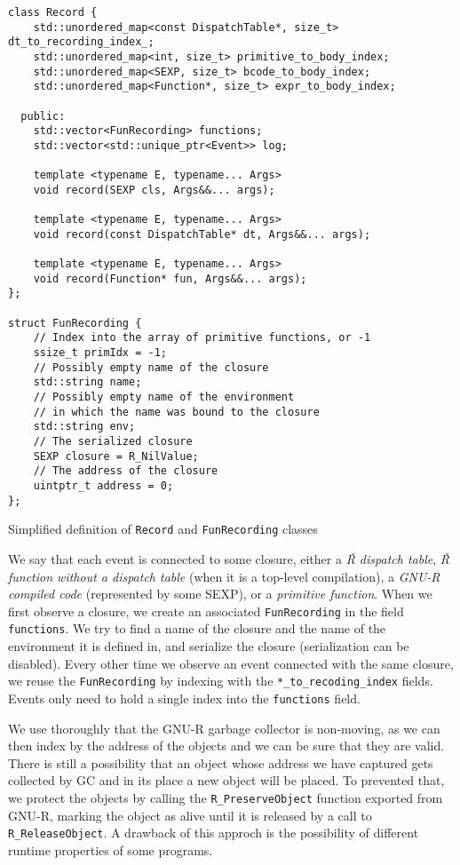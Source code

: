 \begin{listing}
	\begin{verbatim}
class Record {
    std::unordered_map<const DispatchTable*, size_t> dt_to_recording_index_;
    std::unordered_map<int, size_t> primitive_to_body_index;
    std::unordered_map<SEXP, size_t> bcode_to_body_index;
    std::unordered_map<Function*, size_t> expr_to_body_index;

  public:
    std::vector<FunRecording> functions;
    std::vector<std::unique_ptr<Event>> log;

    template <typename E, typename... Args>
    void record(SEXP cls, Args&&... args);

    template <typename E, typename... Args>
    void record(const DispatchTable* dt, Args&&... args);

    template <typename E, typename... Args>
    void record(Function* fun, Args&&... args);
};

struct FunRecording {
    // Index into the array of primitive functions, or -1
    ssize_t primIdx = -1;
    // Possibly empty name of the closure
    std::string name;
    // Possibly empty name of the environment
    // in which the name was bound to the closure
    std::string env;
    // The serialized closure
    SEXP closure = R_NilValue;
    // The address of the closure
    uintptr_t address = 0;
};
  \end{verbatim}
	\caption{Simplified definition of \texttt{Record} and \texttt{FunRecording} classes }\label{lst:record-class}
\end{listing}

We say that each event is connected to some closure, either a \textit{Ř dispatch table}, \textit{Ř function without a dispatch table} (when it is a top-level compilation), a \textit{GNU-R compiled code} (represented by some SEXP), or a \textit{primitive function}. When we first observe a closure, we create an associated \texttt{FunRecording} in the field \texttt{functions}. We try to find a name of the closure and the name of the environment it is defined in, and serialize the closure (serialization can be disabled). Every other time we observe an event connected with the same closure, we reuse the \texttt{FunRecording} by indexing with the \texttt{*\_to\_recoding\_index} fields. Events only need to hold a single index into the \texttt{functions} field.

We use thoroughly that the GNU-R garbage collector is non-moving, as we can then index by the address of the objects and we can be sure that they are valid. There is still a possibility that an object whose address we have captured gets collected by GC and in its place a new object will be placed. To prevented that, we protect the objects by calling the \texttt{R\_PreserveObject} function exported from GNU-R, marking the object as alive until it is released by a call to \texttt{R\_ReleaseObject}. A drawback of this approch is the possibility of different runtime properties of some programs.

